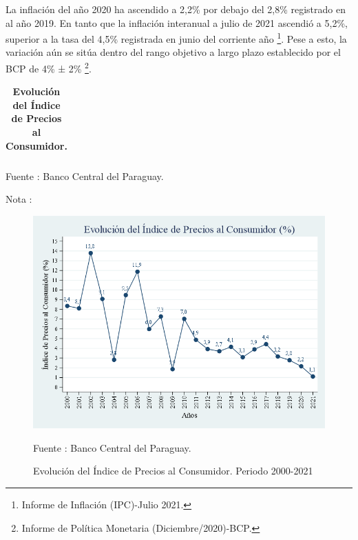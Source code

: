 La inflación del año 2020 ha ascendido a 2,2\% por debajo del 2,8\%
registrado en al año 2019. En tanto que la inflación interanual a julio
de 2021 ascendió a 5,2\%, superior a la tasa del 4,5\% registrada en
junio del corriente año \footnote{Informe de
 Inflación (IPC)-Julio 2021.}. Pese a esto, la variación aún se sitúa
dentro del rango objetivo a largo plazo establecido por el BCP de 4\% ±
2\% \footnote{Informe de Política Monetaria (Diciembre/2020)-BCP.}.

\begin{table}[H]
\begin{center}
\scriptsize
\caption{\bf{Evolución del Índice de Precios al Consumidor.}}
\begin{tabular}{l|rrrrrrrrrrrrrrr}

\end{tabular}
                    \item \footnotesize Fuente : Banco Central del Paraguay. 
                    \item \footnotesize Nota : 
\end{center}
\end{table}

\begin{figure}[H]
\begin{center}
                    \caption{Evolución del Índice de Precios al Consumidor. Periodo 2000-2021}
                    \includegraphics[scale=0.55]{BCP_ipc_year_mes.png}
                                    \item \footnotesize Fuente : Banco Central del Paraguay. 
                    \end{center}
\end{figure}

